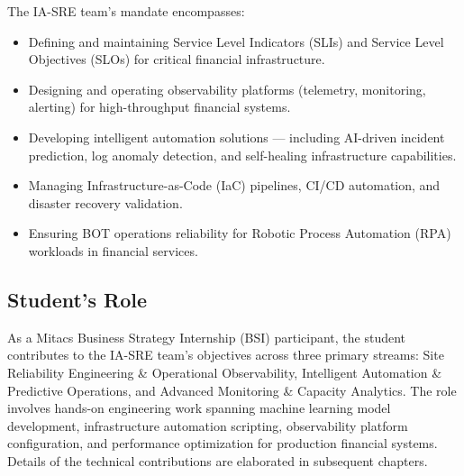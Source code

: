 The IA-SRE team's mandate encompasses:
\begin{itemize}
    \item Defining and maintaining Service Level Indicators (SLIs) and Service Level Objectives (SLOs) for critical financial infrastructure.
    \item Designing and operating observability platforms (telemetry, monitoring, alerting) for high-throughput financial systems.
    \item Developing intelligent automation solutions --- including AI-driven incident prediction, log anomaly detection, and self-healing infrastructure capabilities.
    \item Managing Infrastructure-as-Code (IaC) pipelines, CI/CD automation, and disaster recovery validation.
    \item Ensuring BOT operations reliability for Robotic Process Automation (RPA) workloads in financial services.
\end{itemize}

\subsection{Student's Role}

As a Mitacs Business Strategy Internship (BSI) participant, the student contributes to the IA-SRE team's objectives across three primary streams: Site Reliability Engineering \& Operational Observability, Intelligent Automation \& Predictive Operations, and Advanced Monitoring \& Capacity Analytics. The role involves hands-on engineering work spanning machine learning model development, infrastructure automation scripting, observability platform configuration, and performance optimization for production financial systems. Details of the technical contributions are elaborated in subsequent chapters.
